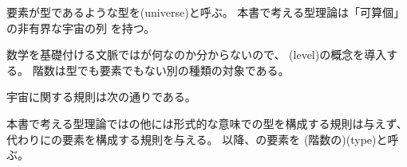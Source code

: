\documentclass[index]{subfiles}
\begin{document}

要素が型であるような型を(universe)と呼ぶ。
本書で考える型理論は「可算個」の非有界な宇宙の列
を持つ。

数学を基礎付ける文脈ではが何なのか分からないので、
(level)の概念を導入する。
階数は型でも要素でもない別の種類の対象である。



宇宙に関する規則は次の通りである。




本書で考える型理論ではの他には形式的な意味での型を構成する規則は与えず、
代わりにの要素を構成する規則を与える。
以降、の要素を
(階数の)(type)と呼ぶ。
\end{document}
